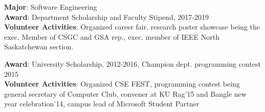 \documentclass[10pt,a4paper,ragged2e,withhyper]{altacv}
\begin{document}
\begin{paracol}{2}

\scriptsize{\textbf{Major}: Software Engineering\\
\textbf{Award}: Department Scholarship and Faculty Stipend, 2017-2019\\
\textbf{Volunteer Activities}: Organized career fair, research poster showcase being the exec. Member of CSGC and GSA rep., exec. member of IEEE North Saskatchewan section.}

\divider

\scriptsize{\textbf{Award}: University Scholarship, 2012-2016, Champion dept. programming contest 2015\\
\textbf{Volunteer Activities}: Organized CSE FEST, programming contest being general secretary of Computer Club, convener at KU Rag'15 and Bangle new year celebration'14, campus lead of Microsoft Student Partner}

\end{paracol}
\end{document}
